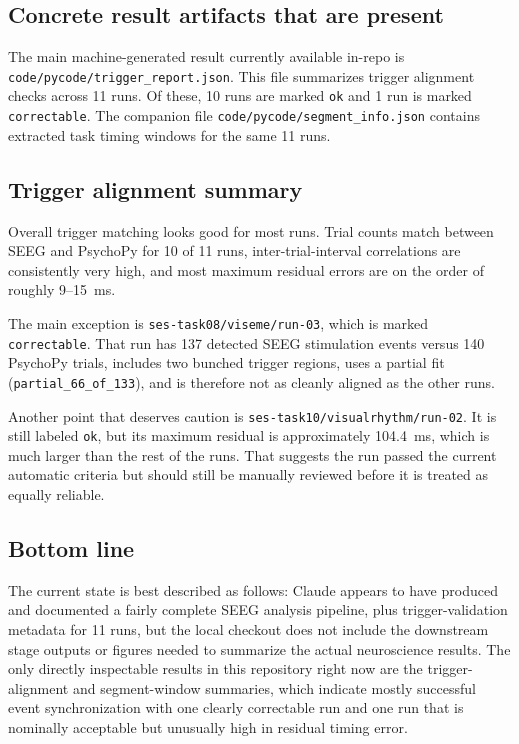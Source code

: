 \subsection*{Concrete result artifacts that are present}

The main machine-generated result currently available in-repo is \texttt{code/pycode/trigger\_report.json}. This file summarizes trigger alignment checks across 11 runs. Of these, 10 runs are marked \texttt{ok} and 1 run is marked \texttt{correctable}. The companion file \texttt{code/pycode/segment\_info.json} contains extracted task timing windows for the same 11 runs.

\subsection*{Trigger alignment summary}

Overall trigger matching looks good for most runs. Trial counts match between SEEG and PsychoPy for 10 of 11 runs, inter-trial-interval correlations are consistently very high, and most maximum residual errors are on the order of roughly 9--15~ms.

The main exception is \texttt{ses-task08/viseme/run-03}, which is marked \texttt{correctable}. That run has 137 detected SEEG stimulation events versus 140 PsychoPy trials, includes two bunched trigger regions, uses a partial fit (\texttt{partial\_66\_of\_133}), and is therefore not as cleanly aligned as the other runs.

Another point that deserves caution is \texttt{ses-task10/visualrhythm/run-02}. It is still labeled \texttt{ok}, but its maximum residual is approximately 104.4~ms, which is much larger than the rest of the runs. That suggests the run passed the current automatic criteria but should still be manually reviewed before it is treated as equally reliable.

\subsection*{Bottom line}

The current state is best described as follows: Claude appears to have produced and documented a fairly complete SEEG analysis pipeline, plus trigger-validation metadata for 11 runs, but the local checkout does not include the downstream stage outputs or figures needed to summarize the actual neuroscience results. The only directly inspectable results in this repository right now are the trigger-alignment and segment-window summaries, which indicate mostly successful event synchronization with one clearly correctable run and one run that is nominally acceptable but unusually high in residual timing error.

